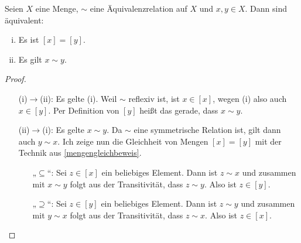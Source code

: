 \begin{satz} \label{aequiklassegleich}
    Seien $X$ eine Menge, $\sim$ eine Äquivalenzrelation auf $X$ und $x,y\in X$. Dann sind äquivalent:
    \begin{enumerate}[(i)]
        \item Es ist $[x]=[y]$.
        \item Es gilt $x\sim y$.
    \end{enumerate}
\end{satz}
\begin{proof} \quad
    \begin{itemize}
        \item[(i)$\to$(ii):] Es gelte (i). Weil $\sim$ reflexiv ist, ist $x\in [x]$, wegen (i) also auch $x\in [y]$. Per Definition von $[y]$ heißt das gerade, dass $x\sim y$.
        \item[(ii)$\to$(i):] Es gelte $x\sim y$. Da $\sim$ eine symmetrische Relation ist, gilt dann auch $y\sim x$. Ich zeige nun die Gleichheit von Mengen $[x]=[y]$ mit der Technik aus \cref{mengengleichbeweis}.
        \begin{itemize}
            \item[„$\subseteq$“:] Sei $z\in [x]$ ein beliebiges Element. Dann ist $z\sim x$ und zusammen mit $x\sim y$ folgt aus der Transitivität, dass $z\sim y$. Also ist $z\in [y]$.
            \item[„$\supseteq$“:] Sei $z\in [y]$ ein beliebiges Element. Dann ist $z\sim y$ und zusammen mit $y\sim x$ folgt aus der Transitivität, dass $z\sim x$. Also ist $z\in [x]$. \qedhere
        \end{itemize}
    \end{itemize}
\end{proof}


